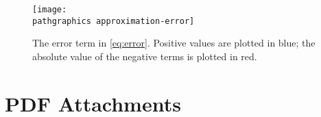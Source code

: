 \documentclass[10pt, oneside]{article}
\newcommand{\pathgraphics}[0]	{../graphics/}
\newcommand{\pathpdf}[0]		{../pdf/}
\begin{document}
\begin{figure}[htbp] %
	\centering
	\texttt{[image: \\pathgraphics approximation-error]} 
	\caption{The error term in \eqref{eq:error}. Positive values are plotted in blue; the absolute value of the negative terms is plotted in red.}
\label{fig:example}
\end{figure}


\section{PDF Attachments} %


\end{document}
